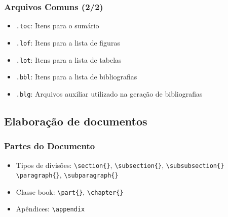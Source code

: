 \begin{frame}
\frametitle{Arquivos Comuns (2/2)}

\begin{itemize}
  \item \texttt{.toc}: Itens para o sumário
  \item \texttt{.lof}: Itens para a lista de figuras
  \item \texttt{.lot}: Itens para a lista de tabelas
  \item \texttt{.bbl}: Itens para a lista de bibliografias
  \item \texttt{.blg}: Arquivos auxiliar utilizado na geração de bibliografias
\end{itemize}
 
\end{frame}


\subsection[]{Elaboração de documentos}\label{sec:elaboracao}
\begin{frame}[fragile]
\frametitle{Partes do Documento}

\begin{itemize}
  \item Tipos de divisões: \verb|\section{}|, \verb|\subsection{}|, \verb|\subsubsection{}|
\verb|\paragraph{}|, \verb|\subparagraph{}|
  \item Classe book: \verb|\part{}|, \verb|\chapter{}|
  \item Apêndices: \verb|\appendix|
\end{itemize}
 
\end{frame}

